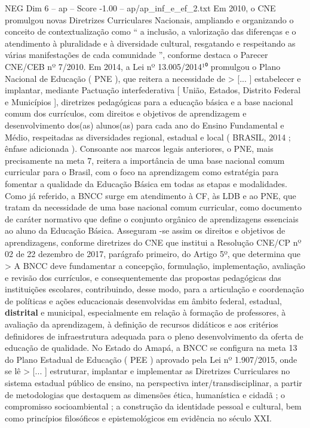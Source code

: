 \begin{textsample}{NEG Dim 6 – ap – Score -1.00 – ap/ap\_inf\_e\_ef\_2.txt}
Em 2010, o CNE promulgou novas Diretrizes Curriculares Nacionais, ampliando e organizando o conceito de contextualização como “ a inclusão, a valorização das diferenças e o atendimento à pluralidade e à diversidade cultural, resgatando e respeitando as várias manifestações de cada comunidade ”, conforme destaca o Parecer CNE/CEB nº 7/2010.
Em 2014, a Lei nº 13.005/2014¹⁰ promulgou o Plano Nacional de Educação ( PNE ), que reitera a necessidade de > [... ] estabelecer e implantar, mediante Pactuação interfederativa [ União, Estados, Distrito Federal e Municípios ], diretrizes pedagógicas para a educação básica e a base nacional comum dos currículos, com direitos e objetivos de aprendizagem e desenvolvimento dos(as) alunos(as) para cada ano do Ensino Fundamental e Médio, respeitadas as diversidades regional, estadual e local ( BRASIL, 2014 ; ênfase adicionada ).
Consoante aos marcos legais anteriores, o PNE, mais precisamente na meta 7, reitera a importância de uma base nacional comum curricular para o Brasil, com o foco na aprendizagem como estratégia para fomentar a qualidade da Educação Básica em todas as etapas e modalidades.
Como já referido, a BNCC surge em atendimento à CF, às LDB e ao PNE, que tratam da necessidade de uma base nacional comum curricular, como documento de caráter normativo que define o conjunto orgânico de aprendizagens essenciais ao aluno da Educação Básica.
Asseguram -se assim os direitos e objetivos de aprendizagens, conforme diretrizes do CNE que institui a Resolução CNE/CP nº 02 de 22 dezembro de 2017, parágrafo primeiro, do Artigo 5º, que determina que > A BNCC deve fundamentar a concepção, formulação, implementação, avaliação e revisão dos currículos, e consequentemente das propostas pedagógicas das instituições escolares, contribuindo, desse modo, para a articulação e coordenação de políticas e ações educacionais desenvolvidas em âmbito federal, estadual, \textbf{distrital} e municipal, especialmente em relação à formação de professores, à avaliação da aprendizagem, à definição de recursos didáticos e aos critérios definidores de infraestrutura adequada para o pleno desenvolvimento da oferta de educação de qualidade.
No Estado do Amapá, a BNCC se configura na meta 13 do Plano Estadual de Educação ( PEE ) aprovado pela Lei nº 1.907/2015, onde se lê > [... ] estruturar, implantar e implementar as Diretrizes Curriculares no sistema estadual público de ensino, na perspectiva inter/transdisciplinar, a partir de metodologias que destaquem as dimensões ética, humanística e cidadã ; o compromisso socioambiental ; a construção da identidade pessoal e cultural, bem como princípios filosóficos e epistemológicos em evidência no século XXI.

\end{textsample}
